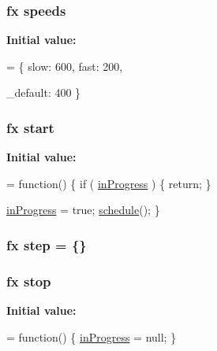 \subsubsection[{\texorpdfstring{speeds}{speeds}}]{ {\bf fx} speeds}\hypertarget{jquery-3_82_81_8js_a1079544ab08b6d4ca1692ce090f6ea2d}{}\label{jquery-3_82_81_8js_a1079544ab08b6d4ca1692ce090f6ea2d}
{\bfseries Initial value\+:}
\begin{DoxyCode}
= \{
    slow: 600,
    fast: 200,

    
    \_default: 400
\}
\end{DoxyCode}
\subsubsection[{\texorpdfstring{start}{start}}]{ {\bf fx} start}\hypertarget{jquery-3_82_81_8js_aef10902ffededd983608fdb8dbfc441a}{}\label{jquery-3_82_81_8js_aef10902ffededd983608fdb8dbfc441a}
{\bfseries Initial value\+:}
\begin{DoxyCode}
= \textcolor{keyword}{function}() \{
    \textcolor{keywordflow}{if} ( \hyperlink{jquery-3_82_81_8js_a3cc8d8f2f5bd39b6b83abe0cf6ad1b5e}{inProgress} ) \{
        \textcolor{keywordflow}{return};
    \}

    \hyperlink{jquery-3_82_81_8js_a3cc8d8f2f5bd39b6b83abe0cf6ad1b5e}{inProgress} = \textcolor{keyword}{true};
    \hyperlink{jquery-3_82_81_8js_a0a981fcb37f061b6bc208ee5510f22d2}{schedule}();
\}
\end{DoxyCode}
\subsubsection[{\texorpdfstring{step}{step}}]{ {\bf fx} step = \{\}}\hypertarget{jquery-3_82_81_8js_a7337229078e935a813e7e0f674fad739}{}\label{jquery-3_82_81_8js_a7337229078e935a813e7e0f674fad739}
\subsubsection[{\texorpdfstring{stop}{stop}}]{ {\bf fx} stop}\hypertarget{jquery-3_82_81_8js_ac9a544302040b74e845b33c285cd10e7}{}\label{jquery-3_82_81_8js_ac9a544302040b74e845b33c285cd10e7}
{\bfseries Initial value\+:}
\begin{DoxyCode}
= \textcolor{keyword}{function}() \{
    \hyperlink{jquery-3_82_81_8js_a3cc8d8f2f5bd39b6b83abe0cf6ad1b5e}{inProgress} = null;
\}
\end{DoxyCode}
